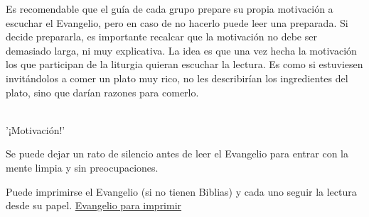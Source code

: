 Es recomendable que el guía de cada grupo prepare su propia motivación a escuchar el Evangelio, pero en caso de no hacerlo puede leer una preparada. Si decide prepararla, es importante recalcar que la motivación no debe ser demasiado larga, ni muy explicativa. La idea es que una vez hecha la motivación los que participan de la liturgia quieran escuchar la lectura. Es como si estuviesen invitándolos a comer un plato muy rico, no les describirían los ingredientes del plato, sino que darían razones para comerlo.

\hfill \\ \hfill
'¡Motivación!'
\hfill \\ \hfill
    
Se puede dejar un rato de silencio antes de leer el Evangelio para entrar con la mente limpia y sin preocupaciones.
    
Puede imprimirse el Evangelio (si no tienen Biblias) y cada uno seguir la lectura desde su papel. \href{¡link!}{\color{amarillo}Evangelio para imprimir}
\hfill \\ \hfill